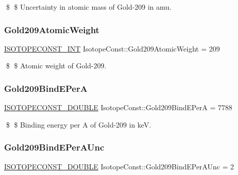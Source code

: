 \$ \$ Uncertainty in atomic mass of Gold-\/209 in amu. \mbox{\label{group___isotope_const-_gold-_au209_gad3ab7c712563d0b5909ab38c5e2e0013}} 
\subsubsection{\texorpdfstring{Gold209\+Atomic\+Weight}{Gold209AtomicWeight}}
{\footnotesize\ttfamily \mbox{\hyperlink{group___isotope_const-_macros_ga5f18360b3e99483a35c32d789e62621c}{I\+S\+O\+T\+O\+P\+E\+C\+O\+N\+S\+T\+\_\+\+I\+NT}} Isotope\+Const\+::\+Gold209\+Atomic\+Weight = 209}

\$ \$ Atomic weight of Gold-\/209. \mbox{\label{group___isotope_const-_gold-_au209_ga33d0d90f0eafff491f44931f32fb086f}} 
\subsubsection{\texorpdfstring{Gold209\+Bind\+E\+PerA}{Gold209BindEPerA}}
{\footnotesize\ttfamily \mbox{\hyperlink{group___isotope_const-_macros_ga8f45a7272ce02c0b4c65c44636ed719a}{I\+S\+O\+T\+O\+P\+E\+C\+O\+N\+S\+T\+\_\+\+D\+O\+U\+B\+LE}} Isotope\+Const\+::\+Gold209\+Bind\+E\+PerA = 7788}

\$ \$ Binding energy per A of Gold-\/209 in keV. \mbox{\label{group___isotope_const-_gold-_au209_gae6ea86bbf9c642514acf4ce21062afb3}} 
\subsubsection{\texorpdfstring{Gold209\+Bind\+E\+Per\+A\+Unc}{Gold209BindEPerAUnc}}
{\footnotesize\ttfamily \mbox{\hyperlink{group___isotope_const-_macros_ga8f45a7272ce02c0b4c65c44636ed719a}{I\+S\+O\+T\+O\+P\+E\+C\+O\+N\+S\+T\+\_\+\+D\+O\+U\+B\+LE}} Isotope\+Const\+::\+Gold209\+Bind\+E\+Per\+A\+Unc = 2}

